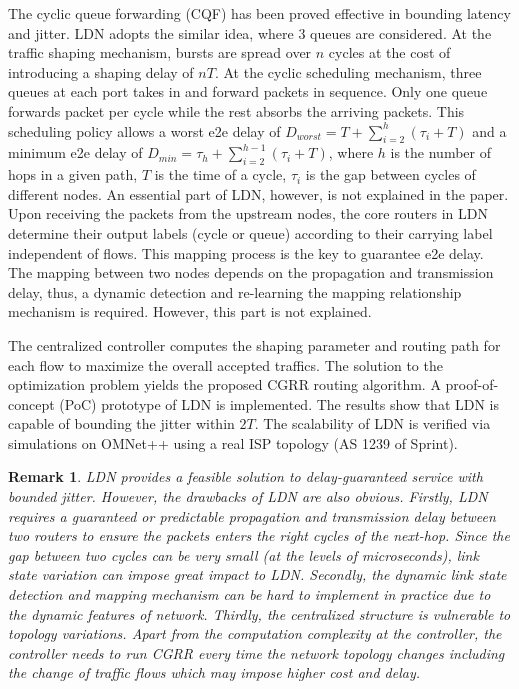 \documentclass[12pt]{article}
\newtheorem*{remark}{Remark}
\begin{document}
The cyclic queue forwarding (CQF) has been proved effective in bounding latency and jitter. LDN adopts the similar idea, where $3$ queues are considered. At the traffic shaping mechanism, bursts are spread over $n$ cycles at the cost of introducing a shaping delay of $nT$. At the cyclic scheduling mechanism, three queues at each port takes in and forward packets in sequence. Only one queue forwards packet per cycle while the rest absorbs the arriving packets. This scheduling policy allows a worst e2e delay of $D_{worst} = T + \sum_{i=2}^h (\tau_i + T)$ and a minimum e2e delay of $D_{min} =  \tau_h + \sum_{i=2}^{h-1} (\tau_i + T)$, where $h$ is the number of hops in a given path, $T$ is the time of a cycle, $\tau_i$ is the gap between cycles of different nodes. 
An essential part of LDN, however, is not explained in the paper. Upon receiving the packets from the upstream nodes, the core routers in LDN determine their output labels (cycle or queue)  according to their carrying label independent of flows. This mapping process is the key to guarantee e2e delay. The mapping between two nodes depends on the propagation and transmission delay, thus, a dynamic detection and re-learning the mapping relationship mechanism is required. However, this part is not explained. 

The centralized controller computes the shaping parameter and routing path for each flow to maximize the overall accepted traffics. The solution to the optimization problem yields the proposed CGRR routing algorithm. A proof-of-concept (PoC) prototype of LDN is implemented. The results show that LDN is capable of bounding the jitter within $2T$. The scalability of LDN is verified via simulations on OMNet++ using a real ISP
topology (AS 1239 of Sprint). 

\begin{remark}
LDN provides a feasible solution to delay-guaranteed service with bounded jitter. However, the drawbacks of LDN are also obvious. Firstly, LDN requires a guaranteed or predictable propagation and transmission delay between two routers to ensure the packets enters the right cycles of the next-hop. Since the gap between two cycles can be very small (at the levels of microseconds), link state variation can impose great impact to LDN. Secondly, the dynamic link state detection and mapping mechanism can be hard to implement in practice due to the dynamic features of network. Thirdly, the centralized structure is vulnerable to topology variations. Apart from the computation complexity at the controller, the controller needs to run CGRR every time the network topology changes including the change of traffic flows which may impose higher cost and delay.

\end{remark}
\end{document}
